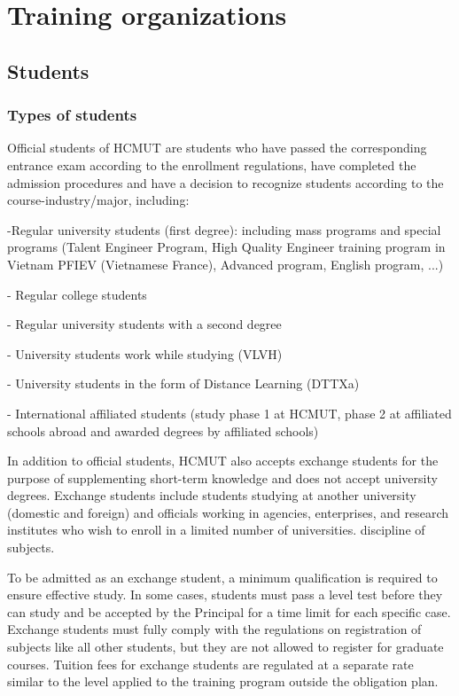 \chapter{Training organizations}
\section{Students}
\subsection{Types of students}
Official students of HCMUT are students who have passed the corresponding entrance exam according to the enrollment regulations, have completed the admission procedures and have a decision to recognize students according to the course-industry/major, including:

-Regular university students (first degree): including mass programs and special programs (Talent Engineer Program, High Quality Engineer training program in Vietnam PFIEV (Vietnamese France), Advanced program, English program, ...)

- Regular college students

- Regular university students with a second degree

- University students work while studying (VLVH)

- University students in the form of Distance Learning (DTTXa)

- International affiliated students (study phase 1 at HCMUT, phase 2 at affiliated schools abroad and awarded degrees by affiliated schools)

In addition to official students, HCMUT also accepts exchange students for the purpose of supplementing short-term knowledge and does not accept university degrees. Exchange students include students studying at another university (domestic and foreign) and officials working in agencies, enterprises, and research institutes who wish to enroll in a limited number of universities. discipline of subjects.

To be admitted as an exchange student, a minimum qualification is required to ensure effective study. In some cases, students must pass a level test before they can study and be accepted by the Principal for a time limit for each specific case. Exchange students must fully comply with the regulations on registration of subjects like all other students, but they are not allowed to register for graduate courses. Tuition fees for exchange students are regulated at a separate rate similar to the level applied to the training program outside the obligation plan.

